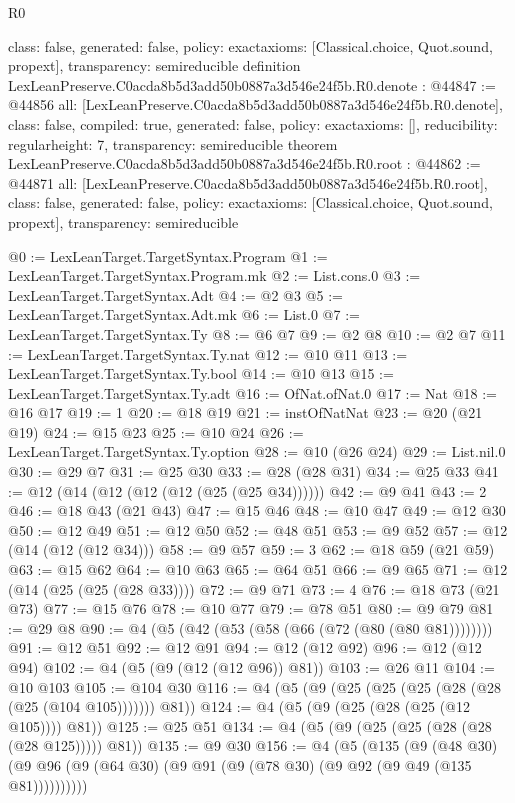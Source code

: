 \begin{lexlean}{R0}
\begin{coremodule}
{  class: false,
  generated: false,
  policy: exact{axioms: [Classical.choice, Quot.sound, propext]},
  transparency: semireducible
}
definition LexLeanPreserve.C0acda8b5d3add50b0887a3d546e24f5b.R0.denote : @44847 := @44856 {
  all: [LexLeanPreserve.C0acda8b5d3add50b0887a3d546e24f5b.R0.denote],
  class: false,
  compiled: true,
  generated: false,
  policy: exact{axioms: []},
  reducibility: regular{height: 7},
  transparency: semireducible
}
theorem LexLeanPreserve.C0acda8b5d3add50b0887a3d546e24f5b.R0.root : @44862 := @44871 {
  all: [LexLeanPreserve.C0acda8b5d3add50b0887a3d546e24f5b.R0.root],
  class: false,
  generated: false,
  policy: exact{axioms: [Classical.choice, Quot.sound, propext]},
  transparency: semireducible
}

@0 := LexLeanTarget.TargetSyntax.Program
@1 := LexLeanTarget.TargetSyntax.Program.mk
@2 := List.cons.{0}
@3 := LexLeanTarget.TargetSyntax.Adt
@4 := @2 @3
@5 := LexLeanTarget.TargetSyntax.Adt.mk
@6 := List.{0}
@7 := LexLeanTarget.TargetSyntax.Ty
@8 := @6 @7
@9 := @2 @8
@10 := @2 @7
@11 := LexLeanTarget.TargetSyntax.Ty.nat
@12 := @10 @11
@13 := LexLeanTarget.TargetSyntax.Ty.bool
@14 := @10 @13
@15 := LexLeanTarget.TargetSyntax.Ty.adt
@16 := OfNat.ofNat.{0}
@17 := Nat
@18 := @16 @17
@19 := 1
@20 := @18 @19
@21 := instOfNatNat
@23 := @20 (@21 @19)
@24 := @15 @23
@25 := @10 @24
@26 := LexLeanTarget.TargetSyntax.Ty.option
@28 := @10 (@26 @24)
@29 := List.nil.{0}
@30 := @29 @7
@31 := @25 @30
@33 := @28 (@28 @31)
@34 := @25 @33
@41 := @12 (@14 (@12 (@12 (@12 (@25 (@25 @34))))))
@42 := @9 @41
@43 := 2
@46 := @18 @43 (@21 @43)
@47 := @15 @46
@48 := @10 @47
@49 := @12 @30
@50 := @12 @49
@51 := @12 @50
@52 := @48 @51
@53 := @9 @52
@57 := @12 (@14 (@12 (@12 @34)))
@58 := @9 @57
@59 := 3
@62 := @18 @59 (@21 @59)
@63 := @15 @62
@64 := @10 @63
@65 := @64 @51
@66 := @9 @65
@71 := @12 (@14 (@25 (@25 (@28 @33))))
@72 := @9 @71
@73 := 4
@76 := @18 @73 (@21 @73)
@77 := @15 @76
@78 := @10 @77
@79 := @78 @51
@80 := @9 @79
@81 := @29 @8
@90 := @4 (@5 (@42 (@53 (@58 (@66 (@72 (@80 (@80 @81))))))))
@91 := @12 @51
@92 := @12 @91
@94 := @12 (@12 @92)
@96 := @12 (@12 @94)
@102 := @4 (@5 (@9 (@12 (@12 @96)) @81))
@103 := @26 @11
@104 := @10 @103
@105 := @104 @30
@116 := @4 (@5 (@9 (@25 (@25 (@25 (@28 (@28 (@25 (@104 @105))))))) @81))
@124 := @4 (@5 (@9 (@25 (@28 (@25 (@12 @105)))) @81))
@125 := @25 @51
@134 := @4 (@5 (@9 (@25 (@25 (@28 (@28 (@28 @125))))) @81))
@135 := @9 @30
@156 := @4
    (@5
      (@135
        (@9
          (@48 @30)
          (@9 @96 (@9 (@64 @30) (@9 @91 (@9 (@78 @30) (@9 @92 (@9 @49 (@135 @81))))))))))

\end{coremodule}
\end{lexlean}

